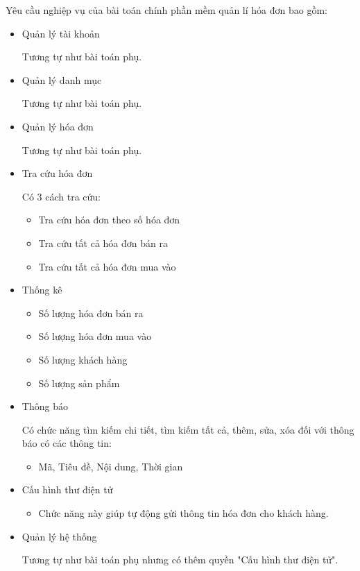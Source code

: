 Yêu cầu nghiệp vụ của bài toán chính phần mềm quản lí hóa đơn bao gồm:

\begin{itemize}

\item Quản lý tài khoản

Tương tự như bài toán phụ.

\item Quản lý danh mục

Tương tự như bài toán phụ.

\item Quản lý hóa đơn

Tương tự như bài toán phụ.

\item Tra cứu hóa đơn

Có 3 cách tra cứu:

\begin{itemize}

\item Tra cứu hóa đơn theo số hóa đơn

\item Tra cứu tất cả hóa đơn bán ra

\item Tra cứu tất cả hóa đơn mua vào

\end{itemize}

\item Thống kê

\begin{itemize}

\item Số lượng hóa đơn bán ra

\item Số lượng hóa đơn mua vào

\item Số lượng khách hàng

\item Số lượng sản phẩm

\end{itemize}

\item Thông báo

Có chức năng tìm kiếm chi tiết, tìm kiếm tất cả, thêm, sửa, xóa đối với thông báo có các thông tin:

\begin{itemize}

\item Mã, Tiêu đề, Nội dung, Thời gian

\end{itemize}

\item Cấu hình thư điện tử

\begin{itemize}

\item Chức năng này giúp tự động gửi thông tin hóa đơn cho khách hàng.

\end{itemize}

\item Quản lý hệ thống

Tương tự như bài toán phụ nhưng có thêm quyền "Cấu hình thư điện tử".

\end{itemize}